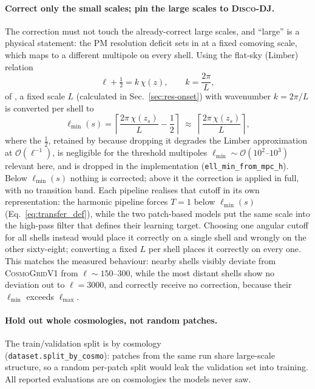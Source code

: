 \documentclass{report}
\begin{document}
\paragraph{Correct only the small scales; pin the large scales to \textsc{Disco-DJ}.} The correction must not touch the already-correct large
scales, and ``large'' is a physical statement: the PM resolution deficit sets in at a fixed
comoving scale, which maps to a different multipole on every shell. Using the flat-sky (Limber) relation
\begin{equation}
  \ell + \tfrac{1}{2} = k\,\chi(z), \qquad k = \frac{2\pi}{L},
  \label{eq:limber}
\end{equation}
of \citeauthor{loverde_extended_2008} \cite{loverde_extended_2008}, a fixed scale $L$ (calculated in Sec.~\ref{sec:res-onset}) with wavenumber \mbox{$k = 2\pi/L$} is converted per shell to
\begin{equation}
  \ell_{\min}(s) = \left\lceil \frac{2\pi\,\chi(z_s)}{L} - \frac{1}{2} \right\rceil
  \;\approx\; \left\lceil \frac{2\pi\,\chi(z_s)}{L} \right\rceil,
  \label{eq:ell_min}
\end{equation}
where the $\tfrac{1}{2}$, retained by \citeauthor{loverde_extended_2008} because dropping it degrades the Limber approximation at $\mathcal{O}(\ell^{-1})$, is negligible for the threshold multipoles $\ell_{\min}\sim\mathcal{O}(10^{2}\text{--}10^{3})$ relevant here, and is dropped in the implementation (\texttt{ell\_min\_from\_mpc\_h}). Below \mbox{$\ell_{\min}(s)$} nothing is corrected; above it the correction is applied in full, with no transition band. Each pipeline realises that cutoff in its own representation: the harmonic pipeline forces \mbox{$T = 1$} below \mbox{$\ell_{\min}(s)$} (Eq.~\ref{eq:transfer_def}), while the two patch-based models put the same scale into the high-pass filter that defines their learning target. Choosing one angular cutoff for all shells instead would place it correctly on a single shell and wrongly on the other sixty-eight; converting a fixed \mbox{$L$} per shell places it correctly on every one. This matches the measured behaviour: nearby shells visibly deviate from \textsc{CosmoGridV1} from \mbox{$\ell \sim 150$}--\mbox{$300$}, while the most distant shells show no deviation out to
\mbox{$\ell = 3000$}, and correctly receive no correction, because their \mbox{$\ell_{\min}$} exceeds \mbox{$\ell_{\max}$}.

\paragraph{Hold out whole cosmologies, not random patches.} The train/validation split is by cosmology \\ (\texttt{dataset.split\_by\_cosmo}): patches from the same run share large-scale structure, so a random per-patch split would leak the validation set into training. All reported evaluations are on cosmologies the models never saw.
\end{document}

